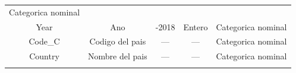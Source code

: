 \documentclass[
]{article}
\begin{document}
\begin{longtable}[]{@{}ccccc@{}}
\begin{minipage}[t]{0.18\columnwidth}
Categorica nominal\strut
\end{minipage}\tabularnewline
\begin{minipage}[t]{0.16\columnwidth}\centering
Year\strut
\end{minipage} & \begin{minipage}[t]{0.21\columnwidth}\centering
Ano\strut
\end{minipage} & \begin{minipage}[t]{0.24\columnwidth}\centering
2000-2018\strut
\end{minipage} & \begin{minipage}[t]{0.07\columnwidth}\centering
Entero\strut
\end{minipage} & \begin{minipage}[t]{0.18\columnwidth}\centering
Categorica nominal\strut
\end{minipage}\tabularnewline
\begin{minipage}[t]{0.16\columnwidth}\centering
Code\_C\strut
\end{minipage} & \begin{minipage}[t]{0.21\columnwidth}\centering
Codigo del pais\strut
\end{minipage} & \begin{minipage}[t]{0.24\columnwidth}\centering
---\strut
\end{minipage} & \begin{minipage}[t]{0.07\columnwidth}\centering
---\strut
\end{minipage} & \begin{minipage}[t]{0.18\columnwidth}\centering
Categorica nominal\strut
\end{minipage}\tabularnewline
\begin{minipage}[t]{0.16\columnwidth}\centering
Country\strut
\end{minipage} & \begin{minipage}[t]{0.21\columnwidth}\centering
Nombre del pais\strut
\end{minipage} & \begin{minipage}[t]{0.24\columnwidth}\centering
---\strut
\end{minipage} & \begin{minipage}[t]{0.07\columnwidth}\centering
---\strut
\end{minipage} & \begin{minipage}[t]{0.18\columnwidth}\centering
Categorica nominal\strut
\end{minipage}\tabularnewline
\begin{minipage}[t]{0.16\columnwidth}\centering

\end{minipage}
\end{longtable}
\end{document}
